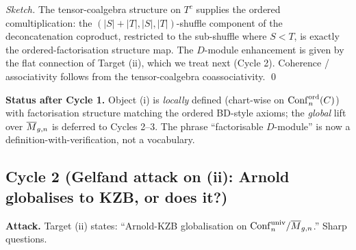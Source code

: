 \begin{proof}[Sketch]
The tensor-coalgebra structure on $T^c$ supplies the ordered
comultiplication: the $(|S|+|T|, |S|, |T|)$-shuffle component of the
deconcatenation coproduct, restricted to the sub-shuffle where $S < T$,
is exactly the ordered-factorisation structure map. The $D$-module
enhancement is given by the flat connection of Target (ii), which we
treat next (Cycle 2). Coherence / associativity follows from the
tensor-coalgebra coassociativity. \qed
\end{proof}

\textbf{Status after Cycle 1.} Object (i) is \emph{locally} defined
(chart-wise on $\mathrm{Conf}_n^{\mathrm{ord}}(C)$) with factorisation structure
matching the ordered BD-style axioms; the \emph{global} lift over
$\overline{M}_{g,n}$ is deferred to Cycles 2--3. The phrase ``factorisable
$D$-module'' is now a definition-with-verification, not a vocabulary.

\subsection*{Cycle 2 (Gelfand attack on (ii): Arnold globalises to
KZB, or does it?)}

\textbf{Attack.} Target (ii) states: ``Arnold-KZB globalisation on
$\mathrm{Conf}_n^{\mathrm{univ}} / \overline{M}_{g,n}$.'' Sharp questions.

